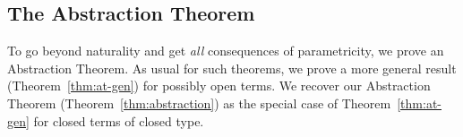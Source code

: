 \documentclass[runningheads]{llncs}
\newcommand{\set}{\mathsf{Set}}
\newcommand{\map}{\mathsf{map}}
\begin{document}
\begin{comment}
So, we can conclude that
\begin{equation}
\map_{\setsem{\Gamma; \ol\alpha \vdash G} \rho[\ol{\alpha := \_}]} \ol{y}
  \circ 
  x_{\ol{{\setsem{\Gamma; \emptyset \vdash \sigma} \rho}}}
= x_{\ol{\setsem{\Gamma; \emptyset \vdash \tau} \rho} }
\circ \map_{\setsem{\Gamma; \ol\alpha \vdash F} 
  \rho[\ol{\alpha := \_}]} \, \ol{y}
\end{equation}

Moreover, for any $\ol{A, B: \set}$,
we can choose $\ol{\sigma = v}$ and $\ol{\tau = w}$ to be variables such that
$\ol{\rho v = A}$ and $\ol{\rho w = B}$.
Then for any functions $\ol{f : A \to B}$ we have that
\begin{equation}
\map_{\setsem{\Gamma; \ol\alpha \vdash G} \rho[\ol{\alpha := \_}]} \ol{f}
  \circ 
  x_{\ol{A}}
  = x_{\ol{B}}
\circ \map_{\setsem{\Gamma; \ol\alpha \vdash F} 
  \rho[\ol{\alpha := \_}]} \, \ol{f}
\end{equation}
\end{proof}
\end{comment}

\vspace*{-0.1in}

\subsection{The Abstraction Theorem}\label{sec:thms} 

To go beyond naturality and get {\em all} consequences of
parametricity, we prove an Abstraction Theorem. As usual for such
theorems, we prove a more general result (Theorem~\ref{thm:at-gen})
for possibly open terms. We recover our Abstraction Theorem
(Theorem~\ref{thm:abstraction}) as the special case of
Theorem~\ref{thm:at-gen} for closed terms of closed type.

\vspace*{-0.05in}
\end{document}
